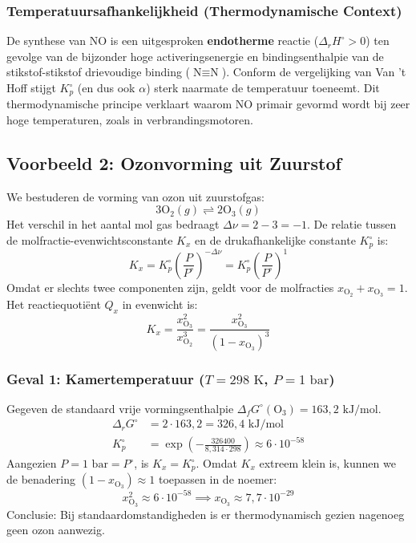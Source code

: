 \documentclass[11pt,a4paper]{article}
\begin{document}
\subsubsection{ Temperatuursafhankelijkheid (Thermodynamische Context)}
De synthese van NO is een uitgesproken \textbf{endotherme} reactie ($\Delta_r H^\circ > 0$) ten gevolge van de bijzonder hoge activeringsenergie en bindingsenthalpie van de stikstof-stikstof drievoudige binding ($\text{N}\equiv\text{N}$). Conform de vergelijking van Van 't Hoff stijgt $K_p^\circ$ (en dus ook $\alpha$) sterk naarmate de temperatuur toeneemt. Dit thermodynamische principe verklaart waarom NO primair gevormd wordt bij zeer hoge temperaturen, zoals in verbrandingsmotoren.

\subsection{Voorbeeld 2: Ozonvorming uit Zuurstof}
We bestuderen de vorming van ozon uit zuurstofgas:
\begin{equation}
    3\text{O}_2(g) \rightleftharpoons 2\text{O}_3(g)
\end{equation}
Het verschil in het aantal mol gas bedraagt $\Delta \nu = 2 - 3 = -1$.
De relatie tussen de molfractie-evenwichtsconstante $K_x$ en de drukafhankelijke constante $K_p^\circ$ is:
\begin{equation}
    K_x = K_p^\circ \left( \frac{P}{P^\circ} \right)^{-\Delta \nu} = K_p^\circ \left( \frac{P}{P^\circ} \right)^{1}
\end{equation}
Omdat er slechts twee componenten zijn, geldt voor de molfracties $x_{\text{O}_2} + x_{\text{O}_3} = 1$. Het reactiequotiënt $Q_x$ in evenwicht is:
\begin{equation}
    K_x = \frac{x_{\text{O}_3}^2}{x_{\text{O}_2}^3} = \frac{x_{\text{O}_3}^2}{(1 - x_{\text{O}_3})^3}
\end{equation}


\subsubsection{Geval 1: Kamertemperatuur ($T = 298\text{ K}$, $P = 1\text{ bar}$)}
Gegeven de standaard vrije vormingsenthalpie $\Delta_f G^\circ(\text{O}_3) = 163{,}2 \text{ kJ/mol}$.
\begin{align}
    \Delta_r G^\circ &= 2 \cdot 163{,}2 = 326{,}4 \text{ kJ/mol} \\
    K_p^\circ &= \exp\left( -\frac{326400}{8{,}314 \cdot 298} \right) \approx 6 \cdot 10^{-58}
\end{align}
Aangezien $P = 1\text{ bar} = P^\circ$, is $K_x = K_p^\circ$. Omdat $K_x$ extreem klein is, kunnen we de benadering $(1 - x_{\text{O}_3}) \approx 1$ toepassen in de noemer:
\begin{equation}
    x_{\text{O}_3}^2 \approx 6 \cdot 10^{-58} \implies x_{\text{O}_3} \approx 7{,}7 \cdot 10^{-29}
\end{equation}
Conclusie: Bij standaardomstandigheden is er thermodynamisch gezien nagenoeg geen ozon aanwezig.
\end{document}
